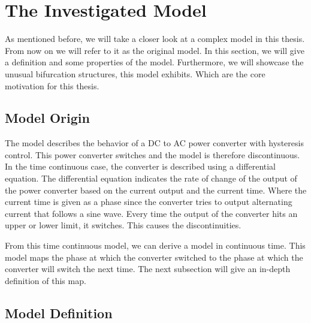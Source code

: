 \section{The Investigated Model}
\label{sec:state.og}

As mentioned before, we will take a closer look at a complex model in this thesis.
From now on we will refer to it as the original model.
In this section, we will give a definition and some properties of the model.
Furthermore, we will showcase the unusual bifurcation structures, this model exhibits.
Which are the core motivation for this thesis.

\subsection{Model Origin}
\label{sec:state.og.orig}

The model describes the behavior of a DC to AC power converter with hysteresis control.
This power converter switches and the model is therefore discontinuous.
In the time continuous case, the converter is described using a differential equation.
The differential equation indicates the rate of change of the output of the power converter based on the current output and the current time.
Where the current time is given as a phase since the converter tries to output alternating current that follows a sine wave.
Every time the output of the converter hits an upper or lower limit, it switches.
This causes the discontinuities.

From this time continuous model, we can derive a model in continuous time.
This model maps the phase at which the converter switched to the phase at which the converter will switch the next time.
The next subsection will give an in-depth definition of this map.

\subsection{Model Definition}
\label{sec:state.og.def}


